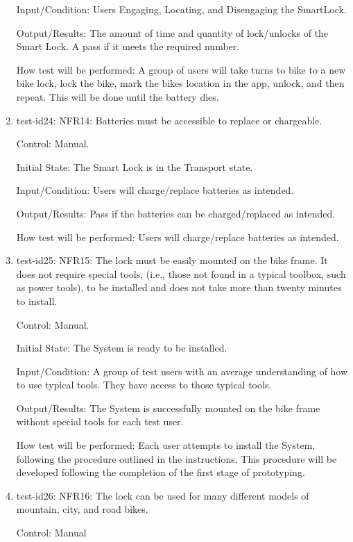 \documentclass[12pt, titlepage]{article}
\begin{document}
\begin{enumerate}
Input/Condition: Users Engaging, Locating, and Disengaging the SmartLock.

Output/Results: The amount of time and quantity of lock/unlocks of the Smart Lock. A pass if it meets the required number.

How test will be performed:  A group of users will take turns to bike to a new bike lock, lock the bike, mark the bikes location in the app, unlock, and then repeat. This will be done until the battery dies.

\item{test-id24: NFR14: Batteries must be accessible to replace or chargeable. \\}

Control: Manual.

Initial State: The Smart Lock is in the Transport state.

Input/Condition: Users will charge/replace batteries as intended.

Output/Results: Pass if the batteries can be charged/replaced as intended.

How test will be performed: Users will charge/replace batteries as intended.

\item{test-id25: NFR15: The lock must be easily mounted on the bike frame. It does not require special tools, (i.e., those not found in a typical toolbox, such as power tools), to be installed and does not take more than twenty minutes to install.  \\}

Control: Manual.

Initial State: The System is ready to be installed.  

Input/Condition: A group of test users with an average understanding of how to use typical tools. They have access to those typical tools. 

Output/Results: The System is successfully mounted on the bike frame without special tools for each test user. 

How test will be performed: Each user attempts to install the System, following the procedure outlined in the instructions. This procedure will be developed following the completion of the first stage of prototyping. 

\item{test-id26: NFR16: The lock can be used for many different models of mountain, city, and road bikes.  \\}

Control: Manual 


\end{enumerate}
\end{document}
